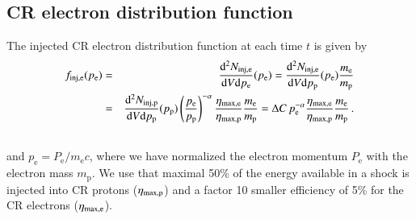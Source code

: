 \documentclass[useAMS,usenatbib]{mn2e}
\newcommand{\dd}{\mathrm{d}}
\newcommand{\p}{\mathrm{p}}
\newcommand{\e}{\mathrm{e}}
\begin{document}
\subsection{CR electron distribution function} 
The injected CR electron distribution function at each time $t$ is
given by
\begin{eqnarray}
  \label{eq:f_inj_e}
  f_\rmn{inj,e}(p_\e) &=&  \frac{\dd^2 N_\rmn{inj,e}}{\dd V \dd p_\e}(p_\e) = 
\frac{\dd^2 N_\rmn{inj,e}}{\dd V \dd p_\p}(p_\e)\frac{m_\e}{m_\p} \nonumber\\
&=& \frac{\dd^2 N_\rmn{inj,p}}{\dd V \dd p_\p}(p_\p)
\left(\frac{p_\e}{p_\p}\right)^{-\alpha}\frac{\eta_\rmn{max,e}}{\eta_\rmn{max,p}}\frac{m_\e}{m_\p} = 
\Delta C\,p_\e^{-\alpha}\frac{\eta_\rmn{max,e}}{\eta_\rmn{max,p}}\frac{m_\e}{m_\p}\,.
 \nonumber\\
&&
\end{eqnarray}
and $p_\e = P_\e/m_\e c$, where we have normalized the electron
momentum $P_\e$ with the electron mass $m_\p$. We use that maximal
50\% of the energy available in a shock is injected into CR protons
($\eta_{\mathrm{max,p}}$) and a factor 10 smaller efficiency of 5\% for the
CR electrons ($\eta_{\mathrm{max,e}}$).
\end{document}
